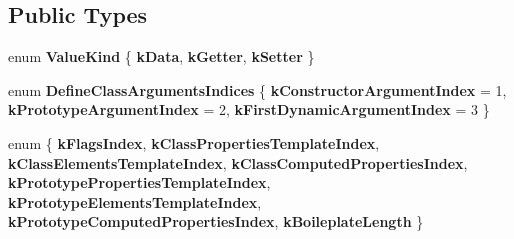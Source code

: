 \subsection*{Public Types}
\begin{DoxyCompactItemize}
\item 
\mbox{\label{classv8_1_1internal_1_1ClassBoilerplate_a5474505e0ac613ae3c7201eca67ccbc7}} 
enum {\bfseries Value\+Kind} \{ {\bfseries k\+Data}, 
{\bfseries k\+Getter}, 
{\bfseries k\+Setter}
 \}
\item 
\mbox{\label{classv8_1_1internal_1_1ClassBoilerplate_ac7400fa5900a212fcaecd80b4aa6f986}} 
enum {\bfseries Define\+Class\+Arguments\+Indices} \{ {\bfseries k\+Constructor\+Argument\+Index} = 1, 
{\bfseries k\+Prototype\+Argument\+Index} = 2, 
{\bfseries k\+First\+Dynamic\+Argument\+Index} = 3
 \}
\item 
\mbox{\label{classv8_1_1internal_1_1ClassBoilerplate_a551033e987cdcfeb71ef14dcf06ac130}} 
enum \{ \newline
{\bfseries k\+Flags\+Index}, 
{\bfseries k\+Class\+Properties\+Template\+Index}, 
{\bfseries k\+Class\+Elements\+Template\+Index}, 
{\bfseries k\+Class\+Computed\+Properties\+Index}, 
\newline
{\bfseries k\+Prototype\+Properties\+Template\+Index}, 
{\bfseries k\+Prototype\+Elements\+Template\+Index}, 
{\bfseries k\+Prototype\+Computed\+Properties\+Index}, 
{\bfseries k\+Boileplate\+Length}
 \}
\end{DoxyCompactItemize}
